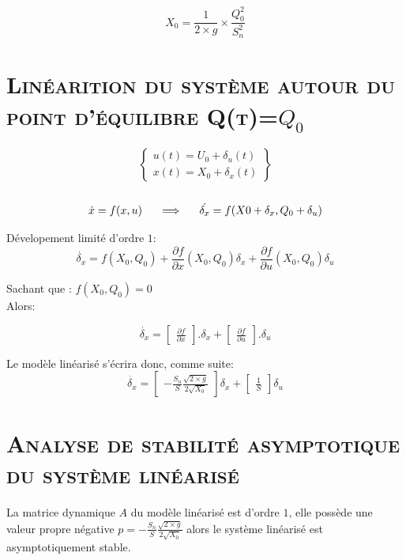 \[ X_0 = \frac{1}{2 \times g} \times \frac{Q^2_0}{S^2_n} \]


\section{\textsc{Linéarition du système autour du point d'équilibre Q(t)=$Q_0$}}

$$ \left\{
\begin{array}{l}
    u(t)=U_0+\delta_u(t)\\
    x(t)=X_0+\delta_x(t)
\end{array}
\right\} $$\\[0.25 cm]

\[\dot{x}=f(x,u) \indent \Longrightarrow \indent \dot{\delta_x}=f(X0+\delta_x ,Q_0+\delta_u)\]

Dévelopement limité d'ordre $1$:\\

\[\dot{\delta_x}=f(X_0,Q_0)+\frac{\partial f}{ \partial x}(X_0,Q_0)\delta_x + \frac{\partial f}{\partial u}(X_0,Q_0) \delta_u\]

Sachant que : \indent \indent $f(X_0,Q_0)=0$\\
Alors:

\[\dot{\delta_x}=\begin{bmatrix}\frac{\partial f}{ \partial x }\end{bmatrix}.\delta_x + \begin{bmatrix}\frac{\partial f}{\partial u}\end{bmatrix}.\delta_u\]

Le modèle linéarisé s'écrira donc, comme suite:\\

\[\dot{\delta_x}=\begin{bmatrix}-\frac{S_n}{S}\frac{\sqrt{2\times g}}{2\sqrt{X_0}}\end{bmatrix}\delta_x+\begin{bmatrix}\frac{1}{S}\end{bmatrix}\delta_u\]

\section{\textsc{Analyse de stabilité asymptotique du système linéarisé}}

	\par La matrice dynamique $A$ du modèle linéarisé est d'ordre $1$, elle possède une valeur propre négative $p=-\frac{S_n}{S}\frac{\sqrt{2\times g}}{2\sqrt{X_0}}$ alors le système linéarisé est asymptotiquement stable.     



